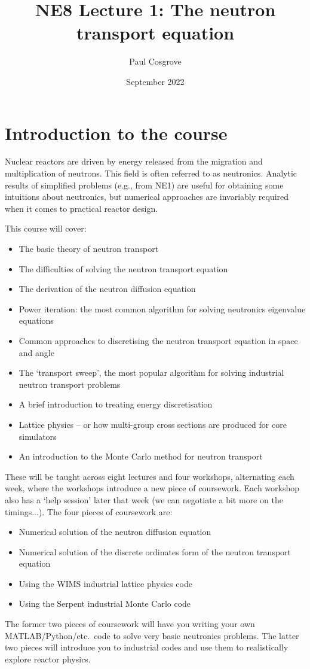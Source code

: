 \documentclass{article}
\title{NE8 Lecture 1: The neutron transport equation}
\author{Paul Cosgrove}
\date{September 2022}
\begin{document}
\maketitle

\section{Introduction to the course}

Nuclear reactors are driven by energy released from the migration and multiplication of neutrons. This field is often referred to as neutronics. Analytic results of simplified problems (e.g., from NE1) are useful for obtaining some intuitions about neutronics, but numerical approaches are invariably required when it comes to practical reactor design.

This course will cover:
\begin{itemize}
    \item The basic theory of neutron transport
    \item The difficulties of solving the neutron transport equation
    \item The derivation of the neutron diffusion equation
    \item Power iteration: the most common algorithm for solving neutronics eigenvalue equations
    \item Common approaches to discretising the neutron transport equation in space and angle
    \item The `transport sweep', the most popular algorithm for solving industrial neutron transport problems
    \item A brief introduction to treating energy discretisation
    \item Lattice physics -- or how multi-group cross sections are produced for core simulators
    \item An introduction to the Monte Carlo method for neutron transport
\end{itemize}
These will be taught across eight lectures and four workshops, alternating each week, where the workshops introduce a new piece of coursework. Each workshop also has a `help session' later that week (we can negotiate a bit more on the timings...). The four pieces of coursework are:
\begin{itemize}
    \item Numerical solution of the neutron diffusion equation
    \item Numerical solution of the discrete ordinates form of the neutron transport equation
    \item Using the WIMS industrial lattice physics code
    \item Using the Serpent industrial Monte Carlo code
\end{itemize}
The former two pieces of coursework will have you writing your own MATLAB/Python/etc.~code to solve very basic neutronics problems. The latter two pieces will introduce you to industrial codes and use them to realistically explore reactor physics.
\end{document}
